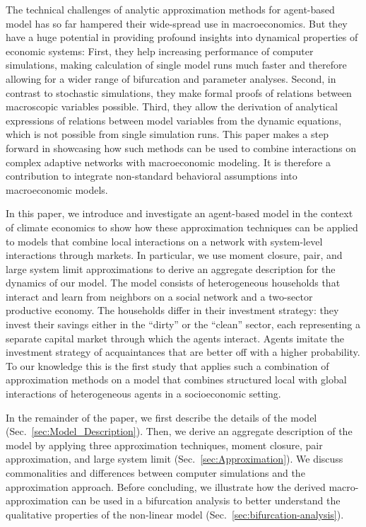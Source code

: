 The technical challenges of analytic approximation methods for agent-based model has so far hampered their wide-spread use in macroeconomics. But they have a huge potential in providing profound insights into dynamical properties of economic systems: First, they help increasing performance of computer simulations, making calculation of single model runs much faster and therefore allowing for a wider range of bifurcation and parameter analyses. Second, in contrast to stochastic simulations, they make formal proofs of relations between macroscopic variables possible. Third, they allow the derivation of analytical expressions of relations between model variables from the dynamic equations, which is not possible from single simulation runs. This paper makes a step forward in showcasing how such methods can be used to combine interactions on complex adaptive networks with macroeconomic modeling. It is therefore a contribution to integrate non-standard behavioral assumptions into macroeconomic models.

In this paper, we introduce and investigate an agent-based model in the context of climate economics to show how these approximation techniques can be applied to models that combine local interactions on a network with system-level interactions through markets.
In particular, we use moment closure, pair, and large system limit approximations to derive an aggregate description for the dynamics of our model.
The model consists of heterogeneous households that interact and learn from neighbors on a social network and a two-sector productive economy.
The households differ in their investment strategy: they invest their savings either in the ``dirty'' or the ``clean'' sector, each representing a separate capital market through which the agents interact.
Agents imitate the investment strategy of acquaintances that are better off with a higher probability.
To our knowledge this is the first study that applies such a combination of approximation methods on a model that combines structured local with global interactions of heterogeneous agents in a socioeconomic setting.

In the remainder of the paper, we first describe the details of the model (Sec.~\ref{sec:Model_Description}). Then, we derive an aggregate description of the model by applying three approximation techniques, moment closure, pair approximation, and large system limit (Sec.~\ref{sec:Approximation}). We discuss commonalities and differences between computer simulations and the approximation approach. Before concluding, we illustrate how the derived macro-approximation can be used in a bifurcation analysis to better understand the qualitative properties of the non-linear model (Sec.~\ref{sec:bifurcation-analysis}).

